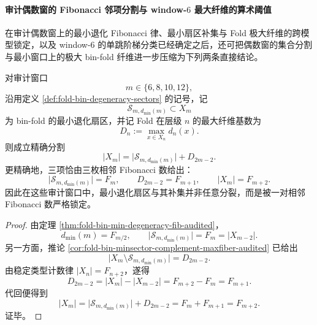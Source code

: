 \paragraph{审计偶数窗的 Fibonacci 邻项分割与 window-\(6\) 最大纤维的算术阈值}
在审计偶数窗上的最小退化 Fibonacci 律、最小扇区补集与 Fold 极大纤维的跨模型锁定，以及 window-\(6\) 的单跳阶梯分类已经确定之后，还可把偶数窗的集合分割与最小窗口上的极大 bin-fold 纤维进一步压缩为下列两条直接结论。

\begin{theorem}\label{thm:xi-time-part60ad-audited-even-fibonacci-neighbor-partition}
对审计窗口
\[
m\in\{6,8,10,12\},
\]
沿用定义 \ref{def:fold-bin-degeneracy-sectors} 的记号，记
\[
\mathcal S_{m,d_{\min}(m)}\subset X_m
\]
为 bin-fold 的最小退化扇区，并记 Fold 在层级 \(n\) 的最大纤维基数为
\[
D_n:=\max_{x\in X_n}d_n(x).
\]
则成立精确分割
\[
|X_m|
=
\bigl|\mathcal S_{m,d_{\min}(m)}\bigr|+D_{2m-2}.
\]
更精确地，三项恰由三枚相邻 Fibonacci 数给出：
\[
\bigl|\mathcal S_{m,d_{\min}(m)}\bigr|=F_m,
\qquad
D_{2m-2}=F_{m+1},
\qquad
|X_m|=F_{m+2}.
\]
因此在这些审计窗口中，最小退化扇区与其补集并非任意分裂，而是被一对相邻 Fibonacci 数严格锁定。
\end{theorem}
\begin{proof}
由定理 \ref{thm:fold-bin-min-degeneracy-fib-audited}，
\[
d_{\min}(m)=F_{m/2},
\qquad
\bigl|\mathcal S_{m,d_{\min}(m)}\bigr|=F_m=|X_{m-2}|.
\]
另一方面，推论 \ref{cor:fold-bin-minsector-complement-maxfiber-audited} 已给出
\[
\bigl|X_m\setminus \mathcal S_{m,d_{\min}(m)}\bigr|=D_{2m-2}.
\]
由稳定类型计数律 \(|X_n|=F_{n+2}\)，遂得
\[
D_{2m-2}
=
|X_m|-|X_{m-2}|
=
F_{m+2}-F_m
=
F_{m+1}.
\]
代回便得到
\[
|X_m|
=
\bigl|\mathcal S_{m,d_{\min}(m)}\bigr|+D_{2m-2}
=
F_m+F_{m+1}
=
F_{m+2}.
\]
证毕。
\end{proof}

